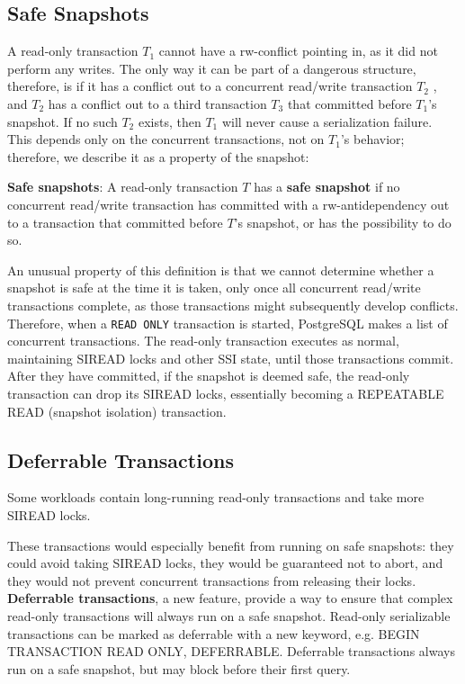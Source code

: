 \documentclass[11pt]{article}
\begin{document}
\subsection{Safe Snapshots}
\label{sec:orga7a90e5}
A read-only transaction \(T_1\) cannot have a rw-conflict pointing in, as it did not perform any
writes. The only way it can be part of a dangerous structure, therefore, is if it has a conflict out
to a concurrent read/write transaction \(T_2\) , and \(T_2\) has a conflict out to a third transaction
\(T_3\) that committed before \(T_1\)’s snapshot. If no such \(T_2\) exists, then \(T_1\) will never
cause a serialization failure. This depends only on the concurrent transactions, not on \(T_1\)’s
behavior; therefore, we describe it as a property of the snapshot:

\textbf{Safe snapshots}: A read-only transaction \(T\) has a \textbf{safe snapshot} if no concurrent read/write
transaction has committed with a rw-antidependency out to a transaction that committed before \(T\)'s
snapshot, or has the possibility to do so.

An unusual property of this definition is that we cannot determine whether a snapshot is safe at the
time it is taken, only once all concurrent read/write transactions complete, as those transactions
might subsequently develop conflicts. Therefore, when a \texttt{READ ONLY} transaction is started, PostgreSQL
makes a list of concurrent transactions. The read-only transaction executes as normal, maintaining
SIREAD locks and other SSI state, until those transactions commit. After they have committed, if the
snapshot is deemed safe, the read-only transaction can drop its SIREAD locks, essentially becoming a
REPEATABLE READ (snapshot isolation) transaction.
\subsection{Deferrable Transactions}
\label{sec:org5907589}
Some workloads contain long-running read-only transactions and take more SIREAD locks.

These transactions would especially benefit from running on safe snapshots: they could avoid taking
SIREAD locks, they would be guaranteed not to abort, and they would not prevent concurrent
transactions from releasing their locks. \textbf{Deferrable transactions}, a new feature, provide a way to
ensure that complex read-only transactions will always run on a safe snapshot. Read-only serializable
transactions can be marked as deferrable with a new keyword, e.g. BEGIN TRANSACTION READ ONLY,
DEFERRABLE. Deferrable transactions always run on a safe snapshot, but may block before their first
query.
\end{document}
